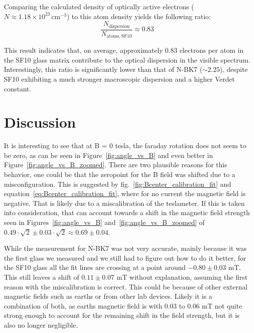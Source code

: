 \documentclass[a4paper]{article}
\begin{document}
Comparing the calculated density of optically active electrons ($N \approx 1.18 \times 10^{23}\,\mathrm{cm}^{-3}$) to this atom density yields the following ratio:
\begin{equation}
  \frac{N_{\mathrm{dispersion}}}{N_{\mathrm{atoms,SF10}}} \approx 0.83
\end{equation}

This result indicates that, on average, approximately 0.83 electrons per atom in the SF10 glass matrix contribute to the optical dispersion in the visible spectrum. Interestingly, this ratio is significantly lower than that of N-BK7 ($\sim 2.25$), despite SF10 exhibiting a much stronger macroscopic dispersion and a higher Verdet constant.

\section{Discussion}

It is interesting to see that at B = 0 tesla, the faraday rotation does not seem to be zero, as can be seen in Figure~\ref{fig:angle_vs_B} and even better in Figure~\ref{fig:angle_vs_B_zoomed}. There are two plausible reasons for this behavior, one could be that the zeropoint for the B field was shifted due to a misconfiguration. This is suggested by fig.~\ref{fig:Bcenter_calibration_fit} and equation~\ref{eq:Bcenter_calibration_fit}, where for no current the magnetic field is negative. That is likely due to a miscalibration of the teslameter. If this is taken into consideration, that can account towards a shift in the magnetic field strength seen in Figures~\ref{fig:angle_vs_B} and~\ref{fig:angle_vs_B_zoomed} of $0.49\cdot\sqrt{2} \pm 0.03 \cdot \sqrt{2} \approx 0.69 \pm 0.04 $.

While the measurement for N-BK7 was not very accurate, mainly because it was the first glass we measured and we still had to figure out how to do it better, for the SF10 glass all the fit lines are crossing at a point around $-0.80 \pm 0.03$ mT. This still leaves a shift of $0.11 \pm 0.07$ mT without explanation, assuming the first reason with the miscalibration is correct. This could be because of other external magnetic fields such as earths or from other lab devices. Likely it is a combination of both, as earths magnetic field is with 0.03 to 0.06 mT \cite{nasa_earth_magnetic_field} not quite strong enough to account for the remaining shift in the field strength, but it is also no longer negligible.
\end{document}
